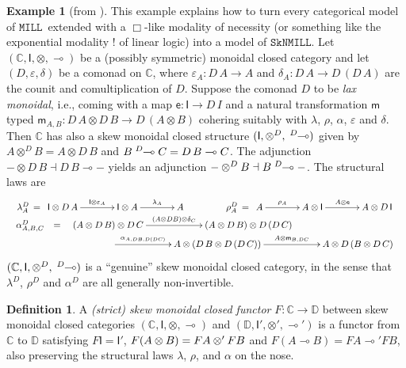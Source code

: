 \documentclass[copyright,creativecommons]{eptcs}
\theoremstyle{definition}
\newtheorem{defn}{Definition}[section]
\newtheorem{example}{Example}[section]
\newcommand{\ot}{\otimes}
\newcommand{\lolli}{\multimap}
\newcommand{\I}{\mathsf{I}}
\newcommand{\otd}{\ot^D}
\newcommand{\lollid}{\;\textsuperscript{$D$}\!\!\lolli}
\newcommand{\MILL}{$\mathtt{MILL}$}
\newcommand{\SkNMILL}{$\mathtt{SkNMILL}$}
\begin{document}
\begin{example}[from \cite{uustalu:eilenberg-kelly:2020}]
This example explains how to turn every categorical model of \MILL\ extended with a $\Box$-like modality of necessity (or something like the exponential modality $!$ of linear logic) into a model of \SkNMILL.
Let $(\mathbb{C},\I,\ot,\lolli)$ be a (possibly symmetric) monoidal closed category and let $(D,\varepsilon, \delta)$ be a comonad on $\mathbb{C}$, where $\varepsilon_A : D\,A \to A$ and $\delta_A : D\,A \to D\,(D\,A)$ are the counit and comultiplication of $D$. Suppose the comonad $D$ to be \emph{lax monoidal}, i.e., coming with a map $\mathsf{e} : \I \to D\,I$ and a natural transformation $\mathsf{m}$ typed $\mathsf{m}_{A,B} : D \,A \ot D\,B \to D\,(A \ot B)$ cohering suitably with $\lambda$, $\rho$, $\alpha$, $\varepsilon$ and $\delta$.
Then $\mathbb{C}$ has also a skew monoidal closed structure $(\I, \otd, \lollid)$ given by  $A \otd B = A \ot D\,B$ and $B \lollid C = D\,B \lolli C$. The adjunction ${-} \ot D\,B \dashv D\,B \lolli {-}$ yields an adjunction ${-} \otd B \dashv B \lollid {-}$. The structural laws are
\[
\begin{array}{c}
\lambda^D_A \, = \, \xymatrix@C=3pc{\I \ot D\,A \ar[r]^-{\I \ot \varepsilon_A} & \I \ot A \ar[r]^-{\lambda_A} & A}
\hspace*{1.5cm}
\rho^D_A \, = \, \xymatrix@C=3pc{A \ar[r]^-{\rho_A} & A \ot \I \ar[r]^-{A \ot \mathsf{e}} & A \ot D\,\I}
\\
\begin{array}{rcl}
\alpha^D_{A,B,C} & = & \xymatrix@C=5pc{(A \ot D\,B) \ot D\,C
                   \ar[r]^-{(A \ot D B) \ot \delta_C}
                   & (A \ot D\,B) \ot D\,(D\,C)} \\
& & \hspace*{1.5cm} \xymatrix@C=5pc{\ar[r]^-{\alpha_{A,DB,D(DC)}}
                  & A \ot (D\,B \ot D\,(D\,C)) \ar[r]^-{A \ot \mathsf{m}_{B,DC}}
                  & A \ot D\,(B \ot D\,C)}
\end{array}
\end{array}
\]
$(\mathbb{C},\I,\otd,\lollid)$  is a ``genuine'' skew monoidal closed category, in the sense that $\lambda^D$, $\rho^D$ and $\alpha^D$ are all generally non-invertible.
\end{example}

\begin{defn}
  A \emph{(strict) skew monoidal closed functor} $F : \mathbb{C} \rightarrow \mathbb{D}$ between skew monoidal closed categories $(\mathbb{C} , \I , \ot , \lolli)$ and $(\mathbb{D} , \I' , \ot' , \lolli')$ is a functor from $\mathbb{C}$ to $\mathbb{D}$ satisfying
    $F \I = \I'$, $F (A \ot B) = \linebreak F A \ot' F B$ and
    $F(A \lolli B) = F A \lolli' F B$, also preserving the structural laws $\lambda$, $\rho$, and $\alpha$ on the nose.
\end{defn}
\end{document}
